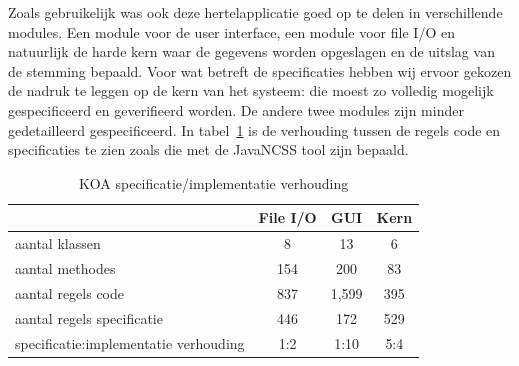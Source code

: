 \documentclass{article}
\begin{document}
Zoals gebruikelijk was ook deze hertelapplicatie goed op te delen in
verschillende modules. Een module voor de user interface, een module voor
file I/O en natuurlijk de harde kern waar de gegevens worden opgeslagen en
de uitslag van de stemming bepaald.
Voor wat betreft de specificaties hebben wij ervoor gekozen de nadruk te 
leggen op de kern van het systeem: die moest zo volledig mogelijk gespecificeerd
en geverifieerd worden. De andere twee modules zijn minder gedetailleerd
gespecificeerd. In tabel~\ref{tab:locs} is de verhouding tussen de regels
code en specificaties te zien zoals die met de JavaNCSS tool zijn bepaald.
\begin{table}[htbp]
  \caption{KOA specificatie/implementatie verhouding}
  \label{tab:locs}
  \begin{center}
    \begin{tabular}{|l|ccc|}
      \hline
      \quad     & \textbf{File I/O} & \textbf{GUI} & \textbf{Kern} \\
      \hline
       aantal klassen & 8                 & 13                     & 6             \\
       aantal methodes & 154               & 200                    & 83            \\
      aantal regels code      & 837               & 1,599                  & 395           \\
      aantal regels specificatie     & 446               & 172                    & 529           \\
      specificatie:implementatie verhouding & 1:2              & 1:10                   & 5:4           \\
      \hline
    \end{tabular}
  \end{center}
\end{table}
\end{document}
